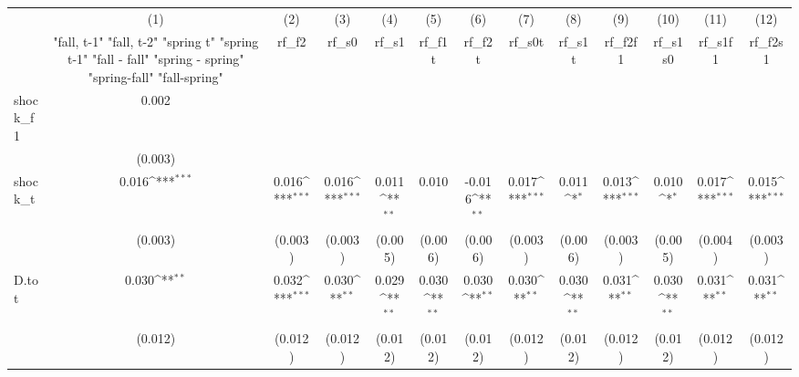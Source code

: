 {
\def\sym#1{\ifmmode^{#1}\else\(^{#1}\)\fi}
\begin{tabular}{l*{12}{c}}
\toprule
            &\multicolumn{1}{c}{(1)}&\multicolumn{1}{c}{(2)}&\multicolumn{1}{c}{(3)}&\multicolumn{1}{c}{(4)}&\multicolumn{1}{c}{(5)}&\multicolumn{1}{c}{(6)}&\multicolumn{1}{c}{(7)}&\multicolumn{1}{c}{(8)}&\multicolumn{1}{c}{(9)}&\multicolumn{1}{c}{(10)}&\multicolumn{1}{c}{(11)}&\multicolumn{1}{c}{(12)}\\
            &\multicolumn{1}{c}{  "fall, t-1" "fall, t-2" "spring t" "spring t-1"  "fall - fall" "spring - spring" "spring-fall" "fall-spring" }&\multicolumn{1}{c}{rf\_f2}&\multicolumn{1}{c}{rf\_s0}&\multicolumn{1}{c}{rf\_s1}&\multicolumn{1}{c}{rf\_f1t}&\multicolumn{1}{c}{rf\_f2t}&\multicolumn{1}{c}{rf\_s0t}&\multicolumn{1}{c}{rf\_s1t}&\multicolumn{1}{c}{rf\_f2f1}&\multicolumn{1}{c}{rf\_s1s0}&\multicolumn{1}{c}{rf\_s1f1}&\multicolumn{1}{c}{rf\_f2s1}\\
\midrule
shock\_f1    &       0.002         &                     &                     &                     &                     &                     &                     &                     &                     &                     &                     &                     \\
            &     (0.003)         &                     &                     &                     &                     &                     &                     &                     &                     &                     &                     &                     \\
\addlinespace
shock\_t     &       0.016\sym{***}&       0.016\sym{***}&       0.016\sym{***}&       0.011\sym{**} &       0.010         &      -0.016\sym{**} &       0.017\sym{***}&       0.011\sym{*}  &       0.013\sym{***}&       0.010\sym{*}  &       0.017\sym{***}&       0.015\sym{***}\\
            &     (0.003)         &     (0.003)         &     (0.003)         &     (0.005)         &     (0.006)         &     (0.006)         &     (0.003)         &     (0.006)         &     (0.003)         &     (0.005)         &     (0.004)         &     (0.003)         \\
\addlinespace
D.tot       &       0.030\sym{**} &       0.032\sym{***}&       0.030\sym{**} &       0.029\sym{**} &       0.030\sym{**} &       0.030\sym{**} &       0.030\sym{**} &       0.030\sym{**} &       0.031\sym{**} &       0.030\sym{**} &       0.031\sym{**} &       0.031\sym{**} \\
            &     (0.012)         &     (0.012)         &     (0.012)         &     (0.012)         &     (0.012)         &     (0.012)         &     (0.012)         &     (0.012)         &     (0.012)         &     (0.012)         &     (0.012)         &     (0.012)         \\

\end{tabular}}
